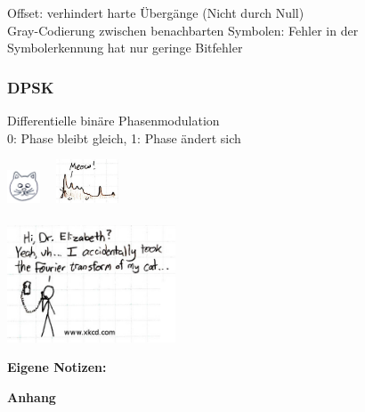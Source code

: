 \documentclass[fs, footer]{latex4ei}
\begin{document}
\begin{multicols*}{4}
{{	Offset: verhindert harte Übergänge (Nicht durch Null)\\
	Gray-Codierung zwischen benachbarten Symbolen: Fehler in der Symbolerkennung hat nur geringe Bitfehler\\	
	}
		\subsubsection{DPSK}
		Differentielle binäre Phasenmodulation\\
		0: Phase bleibt gleich, 1: Phase ändert sich\\


}




\vspace{0.2cm}

 \qquad \includegraphics[height = 1cm]{./img/cat.jpg} \ \raisebox{0.5cm}{$\FT$}\ \includegraphics[height = 1.3cm]{./img/cat_f.jpg}\\
\\
\includegraphics[width = 5cm]{./img/xkcd2.jpg}

\columnbreak
{\Huge \bf Eigene Notizen:}




\newpage
{\Huge \bf Anhang}



\end{multicols*}
\end{document}
